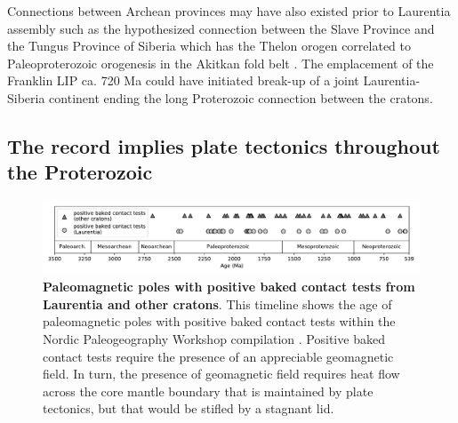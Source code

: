 \documentclass[twocolumn, switch]{article} %
\begin{document}
Connections between Archean provinces may have also existed prior to Laurentia assembly such as the hypothesized connection between the Slave Province and the Tungus Province of Siberia which has the Thelon orogen correlated to Paleoproterozoic orogenesis in the Akitkan fold belt \citep{Condie1994a, Rainbird1998a, Evans2011a}. The emplacement of the Franklin LIP ca. 720 Ma could have initiated break-up of a joint Laurentia-Siberia continent ending the long Proterozoic connection between the cratons. 

\subsection{The record implies plate tectonics throughout the Proterozoic}
\label{sec:plate_tectonics}

\begin{figure}
\centering
\includegraphics[width=\textwidth]{../Figures/baked_contact_timeline_all.pdf}
\caption{\textbf{Paleomagnetic poles with positive baked contact tests from Laurentia and other cratons}. This timeline shows the age of paleomagnetic poles with positive baked contact tests within the Nordic Paleogeography Workshop compilation \citep{Evans2021a}. Positive baked contact tests require the presence of an appreciable geomagnetic field. In turn, the presence of geomagnetic field requires heat flow across the core mantle boundary that is maintained by plate tectonics, but that would be stifled by a stagnant lid.}
\label{fig:baked_contact}
\end{figure}
\end{document}
